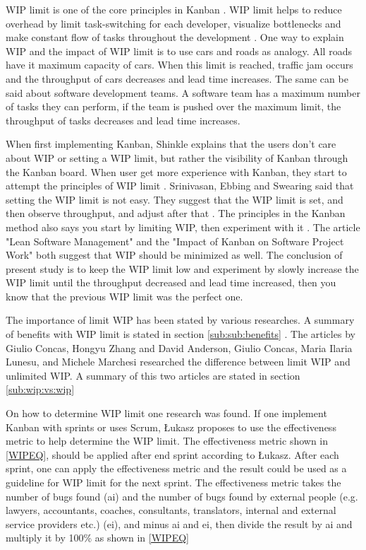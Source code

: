 \documentclass[UKenglish]{ifimaster}  %
\begin{document}
WIP limit is one of the core principles in Kanban \parencite{6068363}. WIP limit helps to reduce overhead by limit task-switching for each developer, visualize bottlenecks and make constant flow of tasks throughout the development \parencite{DavidAnderson}. One way to explain WIP and the impact of WIP limit is to use cars and roads as analogy. All roads have it maximum capacity of cars. When this limit is reached, traffic jam occurs and the throughput of cars decreases and lead time increases. The same can be said about software development teams. A software team has a maximum number of tasks they can perform, if the team is pushed over the maximum limit, the throughput of tasks decreases and lead time increases.

When first implementing Kanban, Shinkle explains that the users don't care about WIP or setting a WIP limit, but rather the visibility of Kanban through the Kanban board. When user get more experience with Kanban, they start to attempt the principles of WIP limit \parencite{Shinkle}. Srinivasan, Ebbing and Swearing said that setting the WIP limit is not easy. They suggest that the WIP limit is set, and then observe throughput, and adjust after that \parencite{Mandyam}. The principles in the Kanban method also says you start by limiting WIP, then experiment with it \parencite{Kniberg}. The article "Lean Software Management" \parencite{Kniberg} and the "Impact of Kanban on Software Project Work" \parencite{Ikonen} both suggest that WIP should be minimized as well. The conclusion of present study is to keep the WIP limit low and experiment by slowly increase the WIP limit until the throughput decreased and lead time increased, then you know that the previous WIP limit was the perfect one.

The importance of limit WIP has been stated by various researches. A summary of benefits with WIP limit is stated in section \ref{sub:sub:benefits} .  The articles by Giulio Concas, Hongyu Zhang \parencite{SMR:SMR1599}  and David Anderson, Giulio Concas, Maria Ilaria Lunesu, and Michele Marchesi \parencite{DavidAnderson} researched the difference between limit WIP and unlimited WIP.  A summary of this two articles are stated in section \ref{sub:wip:vs:wip}

On how to determine WIP limit one research was found. If one implement Kanban with sprints or uses Scrum, \L ukasz proposes to use the effectiveness metric to help determine the WIP limit. The effectiveness metric shown in \ref{WIPEQ}, should be applied after end sprint according to \L ukasz. After each sprint, one can apply the effectiveness metric and the result could be used as a guideline for WIP limit for the next sprint. The effectiveness metric takes the number of bugs found (ai) and the number of bugs found by external people (e.g. lawyers, accountants, coaches, consultants, translators, internal and external service providers etc.) (ei), and minus ai and ei, then divide the result by ai and multiply it by 100\%  as shown in \ref{WIPEQ} \parencite{Sienkiewicz}
\end{document}
